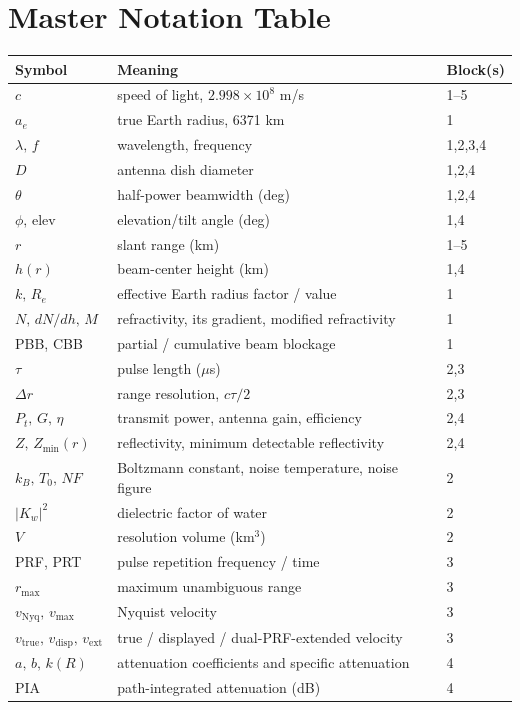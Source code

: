 \documentclass[11pt]{article}
\begin{document}
\newpage
\section{Master Notation Table}
\begin{longtable}{L M L}
\toprule
Symbol & Meaning & Block(s) \\
\midrule
\endhead
$c$ & speed of light, $2.998\times10^8$ m/s & 1--5 \\
$a_e$ & true Earth radius, 6371 km & 1 \\
$\lambda,\,f$ & wavelength, frequency & 1,2,3,4 \\
$D$ & antenna dish diameter & 1,2,4 \\
$\theta$ & half-power beamwidth (deg) & 1,2,4 \\
$\phi,\,\mathrm{elev}$ & elevation/tilt angle (deg) & 1,4 \\
$r$ & slant range (km) & 1--5 \\
$h(r)$ & beam-center height (km) & 1,4 \\
$k,\,R_e$ & effective Earth radius factor / value & 1 \\
$N,\,dN/dh,\,M$ & refractivity, its gradient, modified refractivity & 1 \\
PBB, CBB & partial / cumulative beam blockage & 1 \\
$\tau$ & pulse length ($\mu$s) & 2,3 \\
$\Delta r$ & range resolution, $c\tau/2$ & 2,3 \\
$P_t,\,G,\,\eta$ & transmit power, antenna gain, efficiency & 2,4 \\
$Z,\,Z_{\min}(r)$ & reflectivity, minimum detectable reflectivity & 2,4 \\
$k_B,\,T_0,\,NF$ & Boltzmann constant, noise temperature, noise figure & 2 \\
$|K_w|^2$ & dielectric factor of water & 2 \\
$V$ & resolution volume (km$^3$) & 2 \\
PRF, PRT & pulse repetition frequency / time & 3 \\
$r_{\max}$ & maximum unambiguous range & 3 \\
$v_{\mathrm{Nyq}},\,v_{\max}$ & Nyquist velocity & 3 \\
$v_{\mathrm{true}},\,v_{\mathrm{disp}},\,v_{\mathrm{ext}}$ & true / displayed / dual-PRF-extended velocity & 3 \\
$a,\,b,\,k(R)$ & attenuation coefficients and specific attenuation & 4 \\
PIA & path-integrated attenuation (dB) & 4 \\

\end{longtable}
\end{document}
